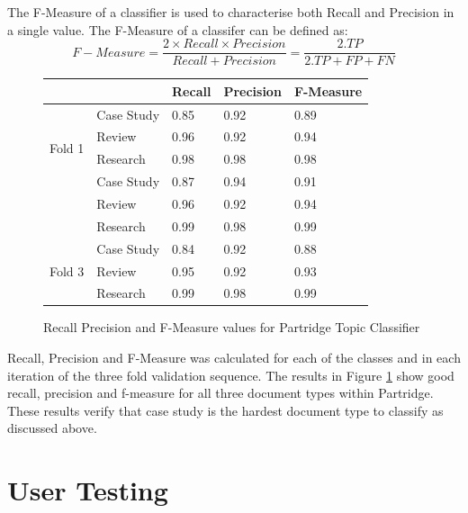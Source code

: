 The F-Measure of a classifier is used to characterise both Recall and Precision
in a single value. The F-Measure of a classifer can be defined as:
\[
F-Measure = \frac{ 2 \times Recall \times Precision} { Recall + Precision } = 
\frac{2 . TP}{ 2 . TP + FP + FN }
\]


\begin{figure}[!th]

\centering
\begin{tabular}{| l | l | l | l | l |}
\hline
&        &\textbf{Recall}&\textbf{Precision}&\textbf{F-Measure}\\
\hline
\hline
\multirow{4}{*}{Fold 1} & Case Study & 0.85 & 0.92 & 0.89 \\
                        & Review     & 0.96 & 0.92 & 0.94 \\
                        & Research   & 0.98 & 0.98 & 0.98 \\
\hline

\multirow{4}{*}{Fold 2} & Case Study & 0.87 & 0.94 & 0.91 \\
                        & Review     & 0.96 & 0.92 & 0.94 \\
                        & Research   & 0.99 & 0.98 & 0.99 \\

\hline

\multirow{4}{*}{Fold 3} &Case Study & 0.84 & 0.92 & 0.88 \\
                        & Review    & 0.95 & 0.92 & 0.93 \\
                        & Research  & 0.99 & 0.98 & 0.99 \\


\hline


\end{tabular}

\caption{Recall Precision and F-Measure values for Partridge Topic Classifier}
\label{fig:fmeasure_table}

\end{figure}

Recall, Precision and F-Measure was calculated for each of the classes and in
each iteration of the three fold validation sequence. The results in Figure
\ref{fig:fmeasure_table} show good recall, precision and f-measure for all
three document types within Partridge. These results verify that case study is
the hardest document type to classify as discussed above.

\section{ User Testing } 

